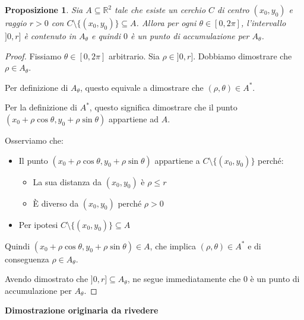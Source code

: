 \documentclass{article}
\theoremstyle{plain}
\newtheorem{prop}[thm]{Proposizione}
\theoremstyle{definition}
\theoremstyle{remark}
\begin{document}
\begin{bxthm}
\begin{prop}
    Sia $A\subseteq\mathbb{R}^2$ tale che esiste un cerchio $C$ di centro $(x_0,y_0)$ e raggio $r>0$ con $C\setminus\{(x_0,y_0)\}\subseteq A$. 
    Allora per ogni $\theta\in[0,2\pi]$, l'intervallo $]0,r]$ è contenuto in $A_\theta$ e quindi $0$ è un punto di accumulazione per $A_\theta$.
\end{prop}
\end{bxthm}
\begin{proof}
    Fissiamo $\theta\in[0,2\pi]$ arbitrario. 
    Sia $\rho\in]0,r]$. Dobbiamo dimostrare che $\rho\in A_\theta$.
    
    Per definizione di $A_\theta$, questo equivale a dimostrare che $(\rho,\theta)\in A^*$.
    
    Per la definizione di $A^*$, questo significa dimostrare che il punto $(x_0+\rho\cos\theta,y_0+\rho\sin\theta)$ appartiene ad $A$.

    Osserviamo che:
    \begin{itemize}
        \item Il punto $(x_0+\rho\cos\theta,y_0+\rho\sin\theta)$ appartiene a $C\setminus\{(x_0,y_0)\}$ perché:
        \begin{itemize}
            \item La sua distanza da $(x_0,y_0)$ è $\rho\leq r$
            \item È diverso da $(x_0,y_0)$ perché $\rho>0$
        \end{itemize}
        \item Per ipotesi $C\setminus\{(x_0,y_0)\}\subseteq A$
    \end{itemize}

    Quindi $(x_0+\rho\cos\theta,y_0+\rho\sin\theta)\in A$, che implica $(\rho,\theta)\in A^*$ e di conseguenza $\rho\in A_\theta$.

    Avendo dimostrato che $]0,r]\subseteq A_\theta$, ne segue immediatamente che $0$ è un punto di accumulazione per $A_\theta$.
\end{proof}
\textbf{Dimostrazione originaria da rivedere}
\end{document}
